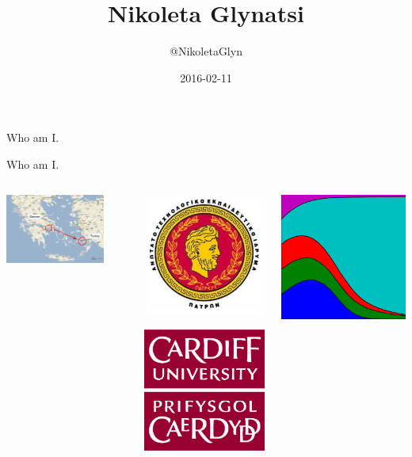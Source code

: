 \documentclass{beamer}
\title{Nikoleta Glynatsi}
\author{@NikoletaGlyn}
\date{2016-02-11}
\begin{document}
\frame{\titlepage}

\begin{frame}
	\begin{center}
		\huge{Who am I.}
	\end{center}
\end{frame}

\begin{frame}{Who am I.}
\begin{columns}[T] %
\begin{column}{.58\textwidth}
  		\includegraphics[width=0.8\textwidth]{static/kos-island-map.png}
\end{column}%
\begin{column}{.38\textwidth}
  		\includegraphics[width=.30\textwidth]{static/tei-patras-logo.jpg}

  		\includegraphics[width=.30\textwidth]{static/cardiff_uni_logo.jpg}
\end{column}%
\begin{column}{.38\textwidth}
  		\includegraphics[width=.30\textwidth]{static/axelrod-logo.png}


\end{column}
\end{columns}
\end{frame}
\end{document}
